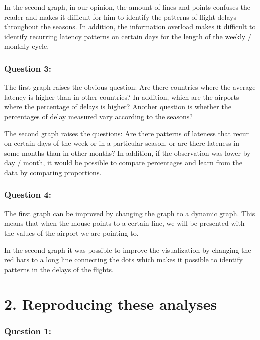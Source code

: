 \documentclass[
]{article}
\begin{document}
In the second graph, in our opinion, the amount of lines and points
confuses the reader and makes it difficult for him to identify the
patterns of flight delays throughout the seasons. In addition, the
information overload makes it difficult to identify recurring latency
patterns on certain days for the length of the weekly / monthly cycle.

\hypertarget{question-3}{%
\subsubsection{Question 3:}\label{question-3}}

The first graph raises the obvious question: Are there countries where
the average latency is higher than in other countries? In addition,
which are the airports where the percentage of delays is higher? Another
question is whether the percentages of delay measured vary according to
the seasons?

The second graph raises the questions: Are there patterns of lateness
that recur on certain days of the week or in a particular season, or are
there lateness in some months than in other months? In addition, if the
observation was lower by day / month, it would be possible to compare
percentages and learn from the data by comparing proportions.

\hypertarget{question-4}{%
\subsubsection{Question 4:}\label{question-4}}

The first graph can be improved by changing the graph to a dynamic
graph. This means that when the mouse points to a certain line, we will
be presented with the values of the airport we are pointing to.

In the second graph it was possible to improve the visualization by
changing the red bars to a long line connecting the dots which makes it
possible to identify patterns in the delays of the flights.

\hypertarget{reproducing-these-analyses}{%
\section{\texorpdfstring{\textbf{2. Reproducing these
analyses}}{2. Reproducing these analyses}}\label{reproducing-these-analyses}}

\hypertarget{question-1-1}{%
\subsubsection{Question 1:}\label{question-1-1}}
\end{document}
